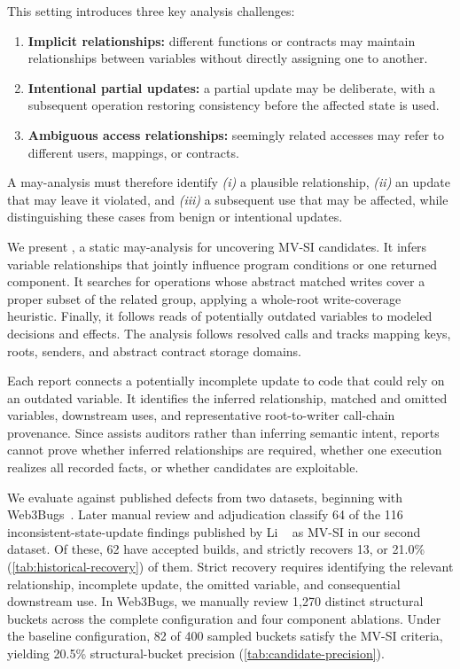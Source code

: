 This setting introduces three key analysis challenges:
\begin{enumerate}[leftmargin=*,nosep]
    \item \textbf{Implicit relationships:}
    different functions or contracts may maintain relationships between
    variables without directly assigning one to another.

    \item \textbf{Intentional partial updates:}
    a partial update may be deliberate, with a subsequent operation
    restoring consistency before the affected state is used.

    \item \textbf{Ambiguous access relationships:}
    seemingly related accesses may refer to different users,
    mappings, or contracts.
\end{enumerate}

A may-analysis must therefore identify
\emph{(i)} a plausible relationship,
\emph{(ii)} an update that may leave it violated, and
\emph{(iii)} a subsequent use that may be affected,
while distinguishing these cases from benign or intentional updates.

We present \sys{}, a static may-analysis for uncovering MV-SI candidates. It infers variable relationships that jointly influence program conditions or one returned component. It searches for operations whose abstract matched writes cover a proper subset of the related group, applying a whole-root write-coverage heuristic. Finally, it follows reads of potentially outdated variables to modeled decisions and effects. The analysis follows resolved calls and tracks mapping keys, roots, senders, and abstract contract storage domains.

Each report connects a potentially incomplete update to code that could rely on an outdated variable. It identifies the inferred relationship, matched and omitted variables, downstream uses, and representative root-to-writer call-chain provenance. Since \sys{} assists auditors rather than inferring semantic intent, reports cannot prove whether inferred relationships are required, whether one execution realizes all recorded facts, or whether candidates are exploitable.

We evaluate \sys{} against published defects from two datasets, beginning with Web3Bugs~\cite{zhang2023demystifying}. Later manual review and adjudication classify 64 of the 116 inconsistent-state-update findings published by Li \etal~\cite{li2026understanding} as MV-SI in our second dataset. Of these, 62 have accepted builds, and \sys{} strictly recovers 13, or 21.0\% (\autoref{tab:historical-recovery}) of them. Strict recovery requires identifying the relevant relationship, incomplete update, the omitted variable, and consequential downstream use. In Web3Bugs, we manually review 1,270 distinct structural buckets across the complete configuration and four component ablations. Under the baseline configuration, 82 of 400 sampled buckets satisfy the MV-SI criteria, yielding 20.5\% structural-bucket precision (\autoref{tab:candidate-precision}).


